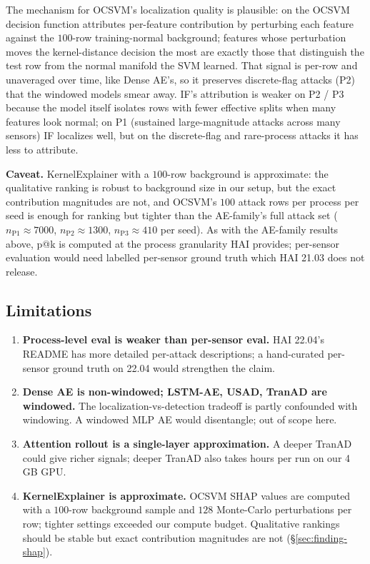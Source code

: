 The mechanism for OCSVM's localization quality is plausible:  on the OCSVM decision function attributes per-feature contribution by perturbing each feature against the $100$-row training-normal background; features whose perturbation moves the kernel-distance decision the most are exactly those that distinguish the test row from the normal manifold the SVM learned.  That signal is per-row and unaveraged over time, like Dense AE's, so it preserves discrete-flag attacks (P2) that the windowed models smear away.  IF's  attribution is weaker on P2 / P3 because the model itself isolates rows with fewer effective splits when many features look normal; on P1 (sustained large-magnitude attacks across many sensors) IF localizes well, but on the discrete-flag and rare-process attacks it has less to attribute.

\textbf{Caveat.}  KernelExplainer with a $100$-row background is approximate: the qualitative ranking is robust to background size in our setup, but the exact contribution magnitudes are not, and OCSVM's $100$ attack rows per process per seed is enough for ranking but tighter than the AE-family's full attack set ($n_{\text{P1}} \approx 7000$, $n_{\text{P2}} \approx 1300$, $n_{\text{P3}} \approx 410$ per seed).  As with the AE-family results above, p@k is computed at the process granularity HAI provides; per-sensor evaluation would need labelled per-sensor ground truth which HAI 21.03 does not release.

\subsection{Limitations}

\begin{enumerate}
  \item \textbf{Process-level eval is weaker than per-sensor eval.}  HAI 22.04's README has more detailed per-attack descriptions; a hand-curated per-sensor ground truth on 22.04 would strengthen the claim.
  \item \textbf{Dense AE is non-windowed; LSTM-AE, USAD, TranAD are windowed.}  The localization-vs-detection tradeoff is partly confounded with windowing.  A windowed MLP AE would disentangle; out of scope here.
  \item \textbf{Attention rollout is a single-layer approximation.}  A deeper TranAD could give richer signals; deeper TranAD also takes hours per run on our 4\,GB GPU.
  \item \textbf{KernelExplainer is approximate.}  OCSVM SHAP values are computed with a $100$-row background sample and $128$ Monte-Carlo perturbations per row; tighter settings exceeded our compute budget.  Qualitative rankings should be stable but exact contribution magnitudes are not (\S\ref{sec:finding-shap}).
\end{enumerate}
